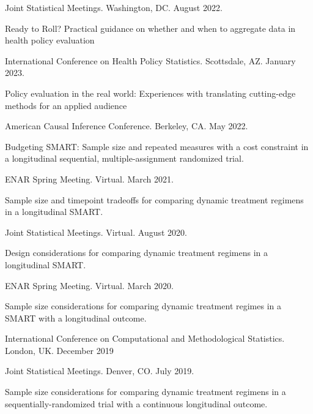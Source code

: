 \documentclass[letterpaper,11pt]{article} %
\begin{document}
\begin{etaremune}
\begin{conflist}
			\item Joint Statistical Meetings. Washington, DC. August 2022.
		\end{conflist}
		\item Ready to Roll? Practical guidance on whether and when to aggregate data in health policy evaluation
		\begin{conflist}
			\item International Conference on Health Policy Statistics. Scottsdale, AZ. January 2023.
		\end{conflist}\item Policy evaluation in the real world: Experiences with translating cutting-edge methods for an applied audience
		\begin{conflist}
			\item American Causal Inference Conference. Berkeley, CA. May 2022.
		\end{conflist}
		\item Budgeting SMART: Sample size and repeated measures with a cost  constraint in a longitudinal sequential, multiple-assignment randomized trial.
		\begin{conflist}
			\item  ENAR Spring Meeting. Virtual. March 2021.
		\end{conflist}
		\item Sample size and timepoint tradeoffs for comparing dynamic treatment regimens in a longitudinal SMART.
		\begin{conflist}
			\item Joint Statistical Meetings. Virtual. August 2020.
		\end{conflist}
		\item Design considerations for comparing dynamic treatment regimens  in a longitudinal SMART.
		\begin{conflist}
			\item ENAR Spring Meeting. Virtual. March 2020.
		\end{conflist}
		\item Sample size considerations for comparing dynamic treatment regimes in a SMART with a longitudinal outcome.
		\begin{conflist}
			\item International Conference on Computational and Methodological Statistics. London, UK. December 2019
			\item Joint Statistical Meetings. Denver, CO. July 2019.
		\end{conflist}
		\item Sample size considerations for comparing dynamic treatment regimens in a sequentially-randomized trial with a continuous longitudinal outcome.

\end{etaremune}
\end{document}
